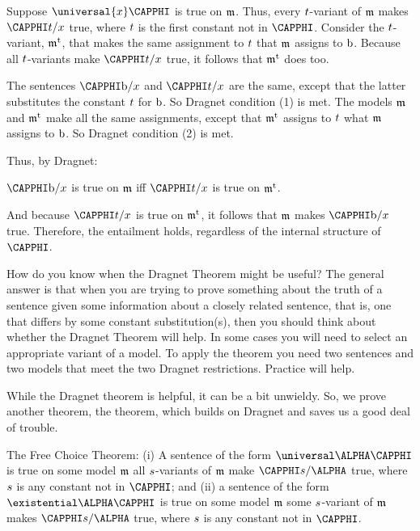 \begin{PROOF}
Suppose $\universal{\variable{x}}\CAPPHI$ is true on $\mathfrak{m}$. 
Thus, every $t$-variant of $\mathfrak{m}$ makes $\CAPPHI\variable{t}/\variable{x}$ true, where $t$ is the first constant not in $\CAPPHI$. 
Consider the $t$-variant, $\mathfrak{m^{\mathrm{t}}_{\mathrm{}}}$, that makes the same assignment to $t$ that $\mathfrak{m}$ assigns to $\mathrm{b}$. Because all $t$-variants make $\CAPPHI\variable{t}/\variable{x}$ true, it follows that $\mathfrak{m^{\mathrm{t}}_{\mathrm{}}}$ does too.

The sentences $\CAPPHI\constant{b}/\variable{x}$ and $\CAPPHI\variable{t}/\variable{x}$ are the same, except that the latter substitutes the constant $t$ for $\mathrm{b}$.  So Dragnet condition (1) is met.  The models $\mathfrak{m}$ and $\mathfrak{m^{\mathrm{t}}_{\mathrm{}}}$ make all the same assignments, except that $\mathfrak{m^{\mathrm{t}}_{\mathrm{}}}$ assigns to $t$ what $\mathfrak{m}$ assigns to $\mathrm{b}$.  So Dragnet condition (2) is met.

Thus, by Dragnet:
\begin{center}
	$\CAPPHI\constant{b}/\variable{x}$ is true on $\mathfrak{m}$ iff $\CAPPHI\variable{t}/\variable{x}$ is true on $\mathfrak{m^{\mathrm{t}}_{\mathrm{}}}$.
\end{center}
And because $\CAPPHI\variable{t}/\variable{x}$ is true on $\mathfrak{m^{\mathrm{t}}_{\mathrm{}}}$, it follows that $\mathfrak{m}$ makes $\CAPPHI\constant{b}/\variable{x}$ true.  Therefore, the entailment holds, regardless of the internal structure of $\CAPPHI$.
\end{PROOF} 

How do you know when the Dragnet Theorem might be useful? 
The general answer is that when you are trying to prove something about the truth of a sentence given some information about a closely related sentence, that is, one that differs by some constant substitution(s), then you should think about whether the Dragnet Theorem will help. 
In some cases you will need to select an appropriate variant of a model. 
To apply the theorem you need two sentences and two models that meet the two Dragnet restrictions. Practice will help.

While the Dragnet theorem is helpful, it can be a bit unwieldy.  So, we prove another theorem, the  theorem, which builds on Dragnet and saves us a good deal of trouble.

\begin{THEOREM}{ The Free Choice Theorem:}
(i) A \GQL{} sentence of the form $\universal\ALPHA\CAPPHI$ is true on some model $\mathfrak{m}$ \Iff all $s$-variants of $\mathfrak{m}$ make $\CAPPHI\variable{s}/\ALPHA$ true, where $s$ is any constant not in $\CAPPHI$; and (ii) a \GQL{} sentence of the form $\existential\ALPHA\CAPPHI$ is true on some model $\mathfrak{m}$ \Iff some $s$-variant of $\mathfrak{m}$ makes $\CAPPHI\variable{s}/\ALPHA$ true, where $s$ is any constant not in $\CAPPHI$.
\end{THEOREM}

